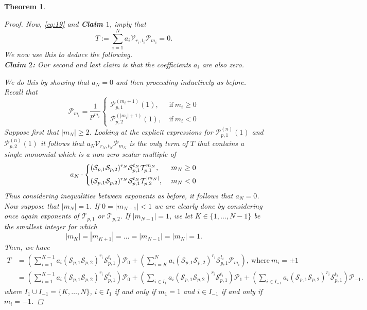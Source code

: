 \documentclass{amsart}%
\theoremstyle{plain}
\newtheorem{thm}{Theorem}[subsection]
\theoremstyle{plain}
\theoremstyle{remark}
\begin{document}
\begin{thm}
\begin{proof}
Now, \eqref{eq:19} and \textbf{Claim $1$}, imply that 
 $$T:=\sum_{i=1}^N a_i\mathscr{V}_{r_i,t_i}\mathscr{P}_{m_i}=0.$$
 We now use this to deduce the following.\\
 \textbf{Claim $2$:} Our second and last claim is that the coefficients $a_i$ are also zero.
 
 We do this by showing that $a_N=0$ and then proceeding inductively as before. Recall that
 $$\mathscr{P}_{m_i}=\frac{1}{p^{m_i}}\begin{cases}
        \mathcal{P}_{p,1}^{(m_i+1)}(1),\ &\mathrm{if}\ m_i\geq 0\\
        \mathcal{P}_{p,2}^{(|m_i|+1)}(1),\ &\mathrm{if}\ m_i<0
    \end{cases}$$
 Suppose first that $|m_N|\geq 2$. Looking at the explicit expressions for $\mathcal{P}_{p,1}^{(n)}(1)$ and $\mathcal{P}_{p,2}^{(n)}(1)$ it follows that $a_N\mathscr{V}_{r_N,t_N}\mathscr{P}_{m_N}$ is the only term of $T$ that contains a single monomial which is a non-zero scalar multiple of
 $$a_N\cdot\begin{dcases}(\mathcal{S}_{p,1}\mathcal{S}_{p,2})^{r_N}\mathcal{S}_{p,1}^{t_N}\mathcal{T}_{p,1}^{m_N},\ &m_N\geq 0\\
(\mathcal{S}_{p,1}\mathcal{S}_{p,2})^{r_N}\mathcal{S}_{p,1}^{t_N}\mathcal{T}_{p,2}^{|m_N|},\ &m_N< 0
 \end{dcases}$$
 Thus considering inequalities between exponents as before, it follows that $a_N=0$. Now suppose that $|m_N|=1$. If $0=|m_{N-1}|<1$ we are clearly done by considering once again exponents of $\mathcal{T}_{p,1}$ or $\mathcal{T}_{p,2}$. If $|m_{N-1}|=1$, we let $K\in\{1,\dots, N-1\}$ be the smallest integer for which $$|m_K|=|m_{K+1}|=\dots=|m_{N-1}|=|m_N|=1.$$
 Then, we have
 \begin{align*}T&=\left(\sum_{i=1}^{K-1}a_i(\mathcal{S}_{p,1}\mathcal{S}_{p,2})^{r_i}\mathcal{S}_{p,1}^{t_i}\right)\mathscr{P}_0+\left(\sum_{i=K}^N a_i(\mathcal{S}_{p,1}\mathcal{S}_{p,2})^{r_i}\mathcal{S}_{p,1}^{t_i}\mathscr{P}_{m_i}\right),\ \text{where}\ m_i=\pm 1\\
 &=\left(\sum_{i=1}^{K-1}a_i(\mathcal{S}_{p,1}\mathcal{S}_{p,2})^{r_i}\mathcal{S}_{p,1}^{t_i}\right)\mathscr{P}_0+\left(\sum_{i\in I_1}a_i(\mathcal{S}_{p,1}\mathcal{S}_{p,2})^{r_i}\mathcal{S}_{p,1}^{t_i}\right)\mathscr{P}_1+ \left(\sum_{i\in I_{-1}}a_i(\mathcal{S}_{p,1}\mathcal{S}_{p,2})^{r_i}\mathcal{S}_{p,1}^{t_i}\right)\mathscr{P}_{-1}.\end{align*}
 where $I_1\cup I_{-1}=\{K,\dots,N\}$, $i\in I_1$ if and only if $m_1=1$ and $i\in I_{-1}$ if and only if $m_i=-1$.

\end{proof}
\end{thm}
\end{document}
